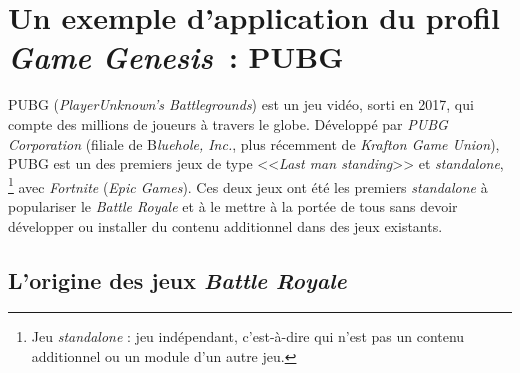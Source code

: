 \chapter{Un exemple d'application du profil \emph{Game Genesis}~: PUBG}
\label{chap.pubg}





PUBG (\emph{PlayerUnknown's Battlegrounds}) est un jeu vidéo, sorti en 2017, qui compte des millions de joueurs à travers le globe. Développé par \emph{PUBG Corporation} (filiale de B\emph{luehole, Inc.}, plus récemment de \emph{Krafton Game Union}), PUBG est un des premiers jeux de type <<\emph{Last man standing}>> et \emph{standalone},%
\footnote{Jeu \emph{standalone} : jeu indépendant, c'est-\`a-dire qui n'est pas un contenu additionnel ou un module d'un autre jeu.}
%
avec  \emph{Fortnite} (\emph{Epic Games}). Ces deux jeux ont été les premiers \emph{standalone} à populariser le \emph{Battle Royale} et à le mettre à la portée de tous sans devoir développer ou installer du contenu additionnel dans des jeux existants.



\section{L'origine des jeux \emph{Battle Royale}}

\label{sect.battle-royale}




